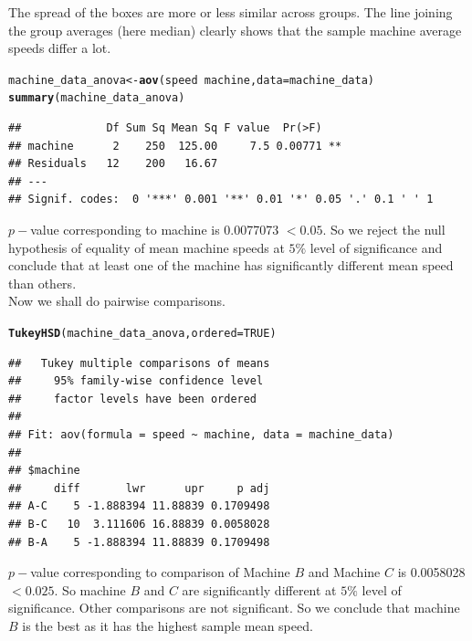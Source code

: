 \documentclass[11pt, a4paper]{article}\usepackage[]{graphicx}\usepackage[]{xcolor}
\makeatletter
\newcommand{\hlnum}[1]{\textcolor[rgb]{0.686,0.059,0.569}{#1}}%
\newcommand{\hlopt}[1]{\textcolor[rgb]{0,0,0}{#1}}%
\newcommand{\hldef}[1]{\textcolor[rgb]{0.345,0.345,0.345}{#1}}%
\newcommand{\hlkwb}[1]{\textcolor[rgb]{0.69,0.353,0.396}{#1}}%
\newcommand{\hlkwc}[1]{\textcolor[rgb]{0.333,0.667,0.333}{#1}}%
\newcommand{\hlkwd}[1]{\textcolor[rgb]{0.737,0.353,0.396}{\textbf{#1}}}%
\newenvironment{kframe}{%
 \def\at@end@of@kframe{}%
 \ifinner\ifhmode%
  \def\at@end@of@kframe{\end{minipage}}%
  \begin{minipage}{\columnwidth}%
 \fi\fi%
 \def\FrameCommand##1{\hskip\@totalleftmargin \hskip-\fboxsep
 \colorbox{shadecolor}{##1}\hskip-\fboxsep
     \hskip-\linewidth \hskip-\@totalleftmargin \hskip\columnwidth}%
 \MakeFramed {\advance\hsize-\width
   \@totalleftmargin\z@ \linewidth\hsize
   \@setminipage}}%
 {\par\unskip\endMakeFramed%
 \at@end@of@kframe}
\newenvironment{knitrout}{}{} %
\makeatother
\begin{document}
The spread of the boxes are more or less similar across groups. The line joining the group averages (here median) clearly shows that the sample machine average speeds differ a lot.

\newpage

\begin{knitrout}
\color{fgcolor}\begin{kframe}
\begin{alltt}
\hldef{machine_data_anova} \hlkwb{<-} \hlkwd{aov}\hldef{(speed} \hlopt{~} \hldef{machine,} \hlkwc{data} \hldef{= machine_data)}
\hlkwd{summary}\hldef{(machine_data_anova)}
\end{alltt}
\begin{verbatim}
##             Df Sum Sq Mean Sq F value  Pr(>F)   
## machine      2    250  125.00     7.5 0.00771 **
## Residuals   12    200   16.67                   
## ---
## Signif. codes:  0 '***' 0.001 '**' 0.01 '*' 0.05 '.' 0.1 ' ' 1
\end{verbatim}
\end{kframe}
\end{knitrout}

$p-$value corresponding to machine is 0.0077073 $< 0.05$. So we reject the null hypothesis of equality of mean machine speeds at $5\%$ level of significance and conclude that at least one of the machine has significantly different mean speed than others. \\

Now we shall do pairwise comparisons.
\begin{knitrout}
\color{fgcolor}\begin{kframe}
\begin{alltt}
\hlkwd{TukeyHSD}\hldef{(machine_data_anova,} \hlkwc{ordered} \hldef{=} \hlnum{TRUE}\hldef{)}
\end{alltt}
\begin{verbatim}
##   Tukey multiple comparisons of means
##     95% family-wise confidence level
##     factor levels have been ordered
## 
## Fit: aov(formula = speed ~ machine, data = machine_data)
## 
## $machine
##     diff       lwr      upr     p adj
## A-C    5 -1.888394 11.88839 0.1709498
## B-C   10  3.111606 16.88839 0.0058028
## B-A    5 -1.888394 11.88839 0.1709498
\end{verbatim}
\end{kframe}
\end{knitrout}

$p-$value corresponding to comparison of Machine $B$ and Machine $C$ is 0.0058028 $< 0.025$. So machine $B$ and $C$ are significantly different at $5\%$ level of significance. Other comparisons are not significant. So we conclude that machine $B$ is the best as it has the highest sample mean speed.
\end{document}
